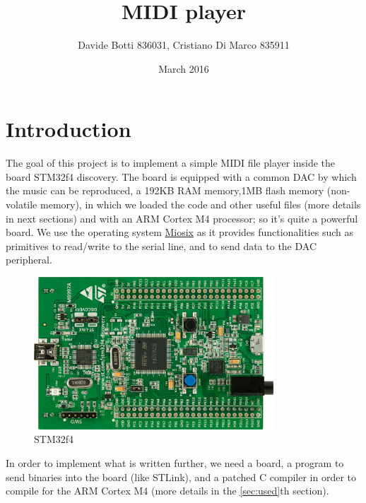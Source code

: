 \documentclass[12pt]{article}
\title{MIDI player}
\date{March 2016}
\author{Davide Botti 836031, Cristiano Di Marco 835911}
\begin{document}
\maketitle
{}
\pagestyle{fancy}
\fancyhead{}
\fancyfoot{}
\fancyfoot[R]{\thepage}
\newpage
{}
\tableofcontents

\newpage
\section{Introduction} \label{sec:intro}
 The goal of this project is to implement a simple MIDI file player inside the board STM32f4 discovery. The board is equipped with a common DAC by which the music can be reproduced, a 192KB RAM memory,1MB flash memory (non-volatile memory), in which we loaded the code and other useful files (more details in next sections) and with an ARM Cortex M4 processor; so it's quite a powerful board. We use the operating system \href{https://miosix.org/}{Miosix} as it provides functionalities such as primitives to read/write to the serial line, and to send data to the DAC peripheral.\newline
 \begin{figure}[H]
 	\includegraphics[width=0.8\textwidth]{STM32F4-Discovery-Board.jpg}
 	\caption{STM32f4}
 	\label{fig:STM32f4Discovery}
 \end{figure}
In order to implement what is written further, we need a board, a program to send binaries into the board (like STLink), and a patched C compiler in order to compile for the ARM Cortex M4 (more details in the \ref{sec:used}th section).
\newpage
\end{document}
